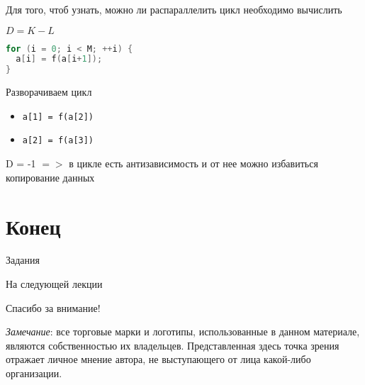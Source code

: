 \begin{frame}[fragile]

Для того, чтоб узнать, можно ли распараллелить цикл необходимо вычислить

$D = K - L$

\begin{lstlisting}[language=C,basicstyle=\ttfamily,keywordstyle=\color{blue},basicstyle=\scriptsize]
for (i = 0; i < M; ++i) {
  a[i] = f(a[i+1]);
}
\end{lstlisting}

Разворачиваем цикл

\begin{itemize}
  \item \texttt{a[1] = f(a[2])}
  \item \texttt{a[2] = f(a[3])}
\end{itemize}

D = -1 $=>$ в цикле есть антизависимость и от нее можно избавиться копирование данных

\end{frame}

\section*{Конец}

\begin{frame}{Задания}
\end{frame}

\begin{frame}{На следующей лекции}
\end{frame}

\begin{frame}

{\huge{Спасибо за внимание!}\par}

\vfill

\tiny{\textit{Замечание}: все торговые марки и логотипы, использованные в данном материале, являются собственностью их владельцев. Представленная здесь точка зрения отражает личное мнение автора, не выступающего от лица какой-либо организации.}

\end{frame}


